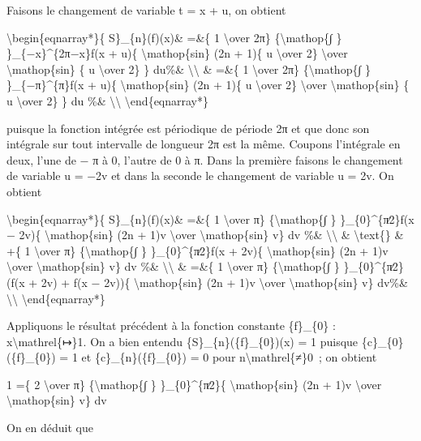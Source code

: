 \documentclass[]{article}
\begin{document}
Faisons le changement de variable t = x + u, on obtient

\textbackslash{}begin\{eqnarray*\}\{ S\}\_\{n\}(f)(x)\& =\&\{ 1
\textbackslash{}over 2π\} \{\textbackslash{}mathop\{∫ \}
\}\_\{−x\}\^{}\{2π−x\}f(x + u)\{ \textbackslash{}mathop\{sin\} (2n +
1)\{ u \textbackslash{}over 2\} \textbackslash{}over
\textbackslash{}mathop\{sin\} \{ u \textbackslash{}over 2\} \} du\%\&
\textbackslash{}\textbackslash{} \& =\&\{ 1 \textbackslash{}over 2π\}
\{\textbackslash{}mathop\{∫ \} \}\_\{−π\}\^{}\{π\}f(x + u)\{
\textbackslash{}mathop\{sin\} (2n + 1)\{ u \textbackslash{}over 2\}
\textbackslash{}over \textbackslash{}mathop\{sin\} \{ u
\textbackslash{}over 2\} \} du \%\& \textbackslash{}\textbackslash{}
\textbackslash{}end\{eqnarray*\}

puisque la fonction intégrée est périodique de période 2π et que donc
son intégrale sur tout intervalle de longueur 2π est la même. Coupons
l'intégrale en deux, l'une de − π à 0, l'autre de 0 à π. Dans la
première faisons le changement de variable u = −2v et dans la seconde le
changement de variable u = 2v. On obtient

\textbackslash{}begin\{eqnarray*\}\{ S\}\_\{n\}(f)(x)\& =\&\{ 1
\textbackslash{}over π\} \{\textbackslash{}mathop\{∫ \}
\}\_\{0\}\^{}\{π∕2\}f(x − 2v)\{ \textbackslash{}mathop\{sin\} (2n + 1)v
\textbackslash{}over \textbackslash{}mathop\{sin\} v\} dv \%\&
\textbackslash{}\textbackslash{} \& \textbackslash{}text\{\} \& +\{ 1
\textbackslash{}over π\} \{\textbackslash{}mathop\{∫ \}
\}\_\{0\}\^{}\{π∕2\}f(x + 2v)\{ \textbackslash{}mathop\{sin\} (2n + 1)v
\textbackslash{}over \textbackslash{}mathop\{sin\} v\} dv \%\&
\textbackslash{}\textbackslash{} \& =\&\{ 1 \textbackslash{}over π\}
\{\textbackslash{}mathop\{∫ \} \}\_\{0\}\^{}\{π∕2\}(f(x + 2v) + f(x −
2v))\{ \textbackslash{}mathop\{sin\} (2n + 1)v \textbackslash{}over
\textbackslash{}mathop\{sin\} v\} dv\%\&
\textbackslash{}\textbackslash{} \textbackslash{}end\{eqnarray*\}

Appliquons le résultat précédent à la fonction constante \{f\}\_\{0\} :
x\textbackslash{}mathrel\{↦\}1. On a bien entendu
\{S\}\_\{n\}(\{f\}\_\{0\})(x) = 1 puisque \{c\}\_\{0\}(\{f\}\_\{0\}) = 1
et \{c\}\_\{n\}(\{f\}\_\{0\}) = 0 pour n\textbackslash{}mathrel\{≠\}0~;
on obtient

1 =\{ 2 \textbackslash{}over π\} \{\textbackslash{}mathop\{∫ \}
\}\_\{0\}\^{}\{π∕2\}\{ \textbackslash{}mathop\{sin\} (2n + 1)v
\textbackslash{}over \textbackslash{}mathop\{sin\} v\} dv

On en déduit que
\end{document}
